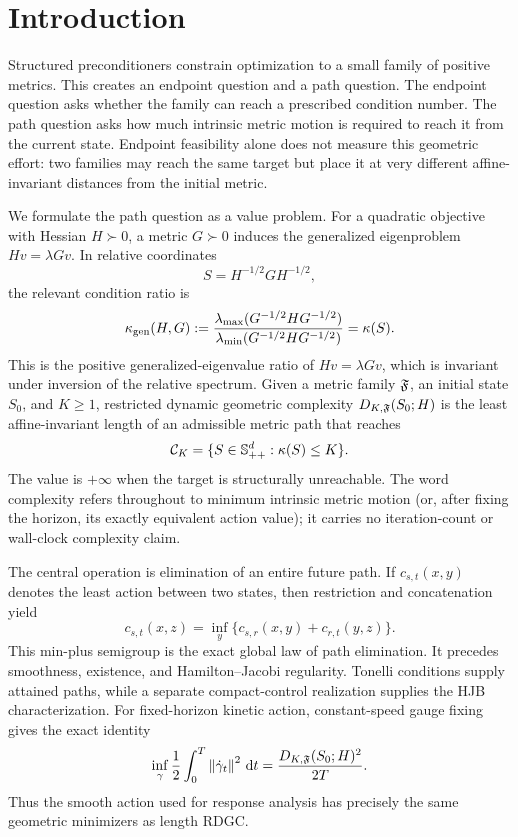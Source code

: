 \section{Introduction}

Structured preconditioners constrain optimization to a small family of
positive metrics.  This creates an endpoint question and a path question.
The endpoint question asks whether the family can reach a prescribed
condition number.  The path question asks how much intrinsic metric motion is
required to reach it from the current state.  Endpoint feasibility alone does
not measure this geometric effort: two families may reach the same target but
place it at very different affine-invariant distances from the initial
metric.

We formulate the path question as a value problem.  For a quadratic objective
with Hessian \(H\succ0\), a metric \(G\succ0\) induces the generalized
eigenproblem \(Hv=\lambda Gv\).  In relative coordinates
\[
  S=H^{-1/2}GH^{-1/2},
\]
the relevant condition ratio is
\[
  \kappa_{\rm gen}(H,G)
  :=\frac{\lambda_{\max}(G^{-1/2}HG^{-1/2})}
  {\lambda_{\min}(G^{-1/2}HG^{-1/2})}
  =\kappa(S).
\]
This is the positive generalized-eigenvalue ratio of \(Hv=\lambda Gv\),
which is invariant under inversion of the relative spectrum.  Given a metric
family \(\mathfrak F\), an initial
state \(S_0\), and \(K\ge1\), restricted dynamic geometric complexity
\(D_{K,\mathfrak F}(S_0;H)\) is the least affine-invariant length of an admissible
metric path that reaches
\[
  \mathcal C_K=\{S\in\mathbb S_{++}^d:\kappa(S)\le K\}.
\]
The value is \(+\infty\) when the target is structurally unreachable.  The
word complexity refers throughout to minimum intrinsic metric motion (or,
after fixing the horizon, its exactly equivalent action value); it carries no
iteration-count or wall-clock complexity claim.

The central operation is elimination of an entire future path.  If
\(c_{s,t}(x,y)\) denotes the least action between two states, then restriction
and concatenation yield
\[
  c_{s,t}(x,z)
  =
  \inf_y\{c_{s,r}(x,y)+c_{r,t}(y,z)\}.
\]
This min-plus semigroup is the exact global law of path elimination.  It
precedes smoothness, existence, and Hamilton--Jacobi regularity.  Tonelli
conditions supply attained paths, while a separate compact-control
realization supplies the HJB characterization.  For fixed-horizon kinetic
action, constant-speed gauge fixing gives the exact identity
\[
  \inf_\gamma\frac12\int_0^T\left\lVert \dot\gamma_t\right\rVert^2\,\mathrm d t
  =
  \frac{D_{K,\mathfrak F}(S_0;H)^2}{2T}.
\]
Thus the smooth action used for response analysis has precisely the same
geometric minimizers as length RDGC.

